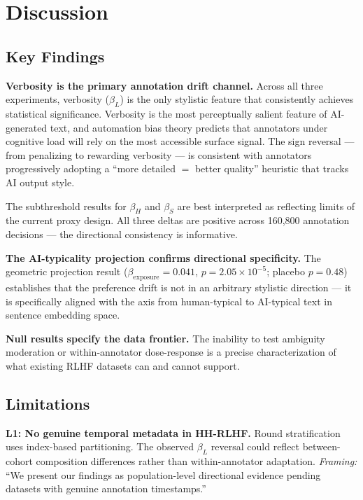 \section{Discussion}
\label{sec:discussion}

\subsection{Key Findings}

\textbf{Verbosity is the primary annotation drift channel.} Across all three experiments, verbosity ($\beta_L$) is the only stylistic feature that consistently achieves statistical significance. Verbosity is the most perceptually salient feature of AI-generated text, and automation bias theory predicts that annotators under cognitive load will rely on the most accessible surface signal. The sign reversal --- from penalizing to rewarding verbosity --- is consistent with annotators progressively adopting a ``more detailed $=$ better quality'' heuristic that tracks AI output style.

The subthreshold results for $\beta_H$ and $\beta_S$ are best interpreted as reflecting limits of the current proxy design. All three deltas are positive across 160,800 annotation decisions --- the directional consistency is informative.

\textbf{The AI-typicality projection confirms directional specificity.} The geometric projection result ($\beta_\text{exposure} = 0.041$, $p = 2.05\times10^{-5}$; placebo $p = 0.48$) establishes that the preference drift is not in an arbitrary stylistic direction --- it is specifically aligned with the axis from human-typical to AI-typical text in sentence embedding space.

\textbf{Null results specify the data frontier.} The inability to test ambiguity moderation or within-annotator dose-response is a precise characterization of what existing RLHF datasets can and cannot support.

\subsection{Limitations}

\textbf{L1: No genuine temporal metadata in HH-RLHF.} Round stratification uses index-based partitioning. The observed $\beta_L$ reversal could reflect between-cohort composition differences rather than within-annotator adaptation. \emph{Framing:} ``We present our findings as population-level directional evidence pending datasets with genuine annotation timestamps.''

